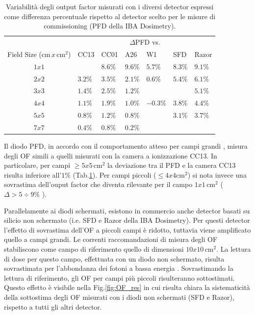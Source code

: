 \begin{table}
\centering
{}
\begin{tabular}{cllllll}
\toprule
  & \multicolumn{6}{c}{$\Delta$PFD vs.}\\
  \cmidrule{2-7}
 
Field Size (cm$\,x\,$cm$^2$) & CC13 & CC01 & A26 & W1 & SFD & Razor\\
\midrule
$1x1$ &        & $8.6\%$ & $9.6\%$ & $5.7\%$ & $8.3\%$ & $9.1\%$\\
$2x2$ & $3.2\%$ & $3.5\%$ & $2.1\%$ & $0.6\%$ & $5.4\%$ & $6.1\%$\\
$3x3$ & $1.4\%$ & $2.5\%$ & $1.2\%$ &  &      & $5.1\%$ \\
$4x4$ & $1.1\%$ & $1.9\%$ & $1.0\%$ & $-0.3\%$ & $3.8\%$ & $4.4\%$ \\
$5x5$ & $0.8\%$ & $1.2\%$ & $0.8\%$	&         & $3.1\%$ & $3.7\%$ \\
$7x7$ & $0.4\%$ & $0.8\%$ & $0.2\%$	&         &         &         \\
\bottomrule
\end{tabular}
\caption{Variabilità degli output factor misurati con i diversi detector espressi come differenza percentuale rispetto al detector scelto per le misure di commissioning (PFD della IBA Dosimetry).}
\label{tab:delta_OF}
\end{table}

Il diodo PFD, in accordo con il comportamento atteso per campi grandi \cite{Griessbach2005}, misura degli OF simili a quelli misurati con la camera a ionizzazione CC13. In particolare, per campi $\geq 5x5\,$cm$^2$ la deviazione tra il PFD e la camera CC13 risulta inferiore all'$1\%$ (Tab.\ref{tab:delta_OF}). Per campi piccoli ($\leq 4x4$cm$^2$) si nota invece una sovrastima dell'ouput factor che diventa rilevante per il campo $1x1\,$cm$^2$ ($\Delta > 5\div9\%$ ).

Parallelamente ai diodi schermati, esistono in commercio anche detector basati su silicio non schermato (i.e. SFD e Razor della IBA Dosimetry). Per questi detector l'effetto di sovrastima dell'OF a piccoli campi è ridotto, tuttavia viene amplificato quello a campi grandi. Le correnti raccomandazioni di misura degli OF \cite{Andreo2006,RaySearchLaboratories2014} stabiliscono come campo di riferimento quello di dimensioni $10x10\,$cm$^2$. La lettura di dose per questo campo, effettuata con un diodo non schermato, risulta sovrastimata per l'abbondanza dei fotoni a bassa energia \cite{Griessbach2005}. Sovrastimando la lettura di riferimento, gli OF per campi più piccoli risulteranno sottostimati. Questo effetto è visibile nella Fig.\ref{fig:OF_res} in cui risulta chiara la sistematicità della sottostima degli OF misurati con i diodi non schermati (SFD e Razor), rispetto a tutti gli altri detector.

